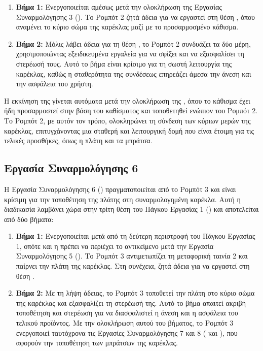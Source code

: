 \begin{enumerate}
    \item \textbf{Βήμα 1:} Ενεργοποιείται αμέσως μετά την ολοκλήρωση της Εργασίας Συναρμολόγησης 3 (). Το Ρομπότ 2 ζητά άδεια για να εργαστεί στη θέση , όπου αναμένει το κύριο σώμα της καρέκλας μαζί με το προσαρμοσμένο κάθισμα.
    \item \textbf{Βήμα 2:} Μόλις λάβει άδεια για τη θέση , το Ρομπότ 2 συνδυάζει τα δύο μέρη, χρησιμοποιώντας εξειδικευμένα εργαλεία για να σφίξει και να εξασφαλίσει τη στερέωσή τους. Αυτό το βήμα είναι κρίσιμο για τη σωστή λειτουργία της καρέκλας, καθώς η σταθερότητα της συνδέσεως επηρεάζει άμεσα την άνεση και την ασφάλεια του χρήστη.
\end{enumerate}

Η εκκίνηση της  γίνεται αυτόματα μετά την ολοκλήρωση της , όπου το κάθισμα έχει ήδη προσαρμοστεί στην βάση του καθίσματος και τοποθετηθεί ενώπιον του Ρομπότ 2. Το Ρομπότ 2, με αυτόν τον τρόπο, ολοκληρώνει τη σύνδεση των κύριων μερών της καρέκλας, επιτυγχάνοντας μια σταθερή και λειτουργική δομή που είναι έτοιμη για τις τελικές προσθήκες, όπως η πλάτη και τα μπράτσα.

\subsection{Εργασία Συναρμολόγησης 6}
Η Εργασία Συναρμολόγησης 6 () πραγματοποιείται από το Ρομπότ 3 και είναι κρίσιμη για την τοποθέτηση της πλάτης στη συναρμολογημένη καρέκλα. Αυτή η διαδικασία λαμβάνει χώρα στην τρίτη θέση του Πάγκου Εργασίας 1 () και αποτελείται από δύο βήματα:

\begin{enumerate}
    \item \textbf{Βήμα 1:} Ενεργοποιείται μετά από τη δεύτερη περιστροφή του Πάγκου Εργασίας 1, οπότε και η  πρέπει να περιέχει το αντικείμενο μετά την Εργασία Συναρμολόγησης 5 (). Το Ρομπότ 3 αντιμετωπίζει τη μεταφορική ταινία 2 και παίρνει την πλάτη της καρέκλας. Στη συνέχεια, ζητά άδεια για να εργαστεί στη θέση .
    \item \textbf{Βήμα 2:} Με τη λήψη άδειας, το Ρομπότ 3 τοποθετεί την πλάτη στο κύριο σώμα της καρέκλας και εξασφαλίζει τη στερέωσή της. Αυτό το βήμα απαιτεί ακριβή τοποθέτηση και στερέωση για να διασφαλιστεί η άνεση και η ασφάλεια του τελικού προϊόντος. Με την ολοκλήρωση αυτού του βήματος, το Ρομπότ 3 ενεργοποιεί ταυτόχρονα τις Εργασίες Συναρμολόγησης 7 και 8 ( και ), που αφορούν την τοποθέτηση των μπράτσων της καρέκλας.
\end{enumerate}

